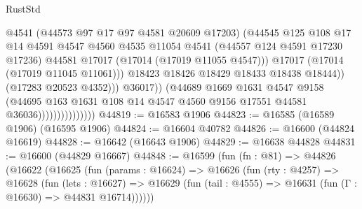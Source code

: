 \begin{lexlean}{RustStd}
\begin{coremodule}
                                            @4541
                                            (@44573 @97 @17 @97 @4581 @20609 @17203)
                                            (@44545
                                              @125
                                              @108
                                              @17
                                              @14
                                              @4591
                                              @4547
                                              @4560
                                              @4535
                                              @11054
                                              @4541
                                              (@44557 @124 @4591 @17230 @17236)
                                              @44581
                                              @17017
                                              (@17014 (@17019 @11055 @4547)))
                                            @17017
                                            (@17014 (@17019 @11045 @11061)))
                                          @18423
                                          @18426
                                          @18429
                                          @18433
                                          @18438
                                          @18444))
                                      (@17283 @20523 @4352)))
                                  @36017))
                              (@44689
                                @1669
                                @1631
                                @4547
                                @9158
                                (@44695
                                  @163
                                  @1631
                                  @108
                                  @14
                                  @4547
                                  @4560
                                  @9156
                                  @17551
                                  @44581
                                  @36036)))))))))))))))
@44819 := @16583 @1906
@44823 := @16585 (@16589 @1906) (@16595 @1906)
@44824 := @16604 @40782
@44826 := @16600 (@44824 @16619)
@44828 := @16642 (@16643 @1906)
@44829 := @16638 @44828
@44831 := @16600 (@44829 @16667)
@44848 := @16599
    (fun (fn : @81) =>
    @44826
      (@16622
        (@16625
          (fun (params : @16624) =>
          @16626
            (fun (rty : @4257) =>
            @16628
              (fun (lets : @16627) =>
              @16629 (fun (tail : @4555) => @16631 (fun (Γ : @16630) => @44831 @16714))))))

\end{coremodule}
\end{lexlean}
